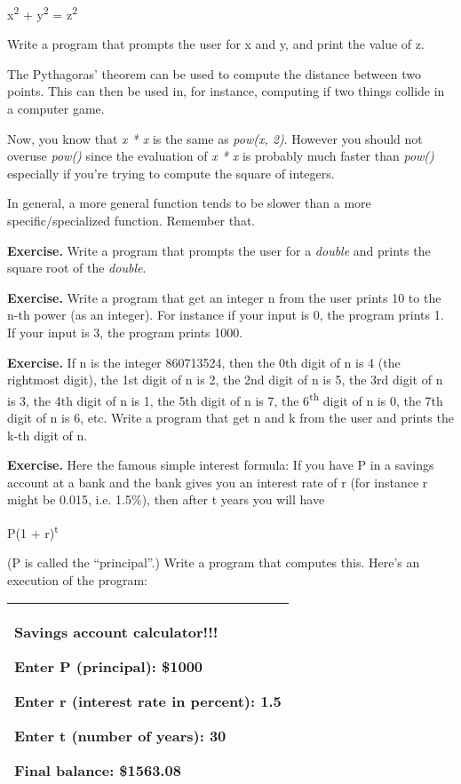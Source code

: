 \documentclass[
]{article}
\begin{document}
x\textsuperscript{2} + y\textsuperscript{2 } = z\textsuperscript{2 }

Write a program that prompts the user for x and y, and print the value
of z.

The Pythagoras' theorem can be used to compute the distance between two
points. This can then be used in, for instance, computing if two things
collide in a computer game.

Now, you know that \emph{x * x} is the same as \emph{pow(x, 2)}. However
you should not overuse \emph{pow()} since the evaluation of \emph{x * x}
is probably much faster than \emph{pow()} especially if you're trying to
compute the square of integers.

In general, a more general function tends to be slower than a more
specific/specialized function. Remember that.

\textbf{Exercise.} Write a program that prompts the user for a
\emph{double} and prints the square root of the \emph{double}.

\textbf{Exercise.} Write a program that get an integer n from the user
prints 10 to the n-th power (as an integer). For instance if your input
is 0, the program prints 1. If your input is 3, the program prints 1000.

\textbf{Exercise.} If n is the integer 860713524, then the 0th digit of
n is 4 (the rightmost digit), the 1st digit of n is 2, the 2nd digit of
n is 5, the 3rd digit of n is 3, the 4th digit of n is 1, the 5th digit
of n is 7, the 6\textsuperscript{th} digit of n is 0, the 7th digit of n
is 6, etc. Write a program that get n and k from the user and prints the
k-th digit of n.

\textbf{Exercise.} Here the famous simple interest formula: If you have
P in a savings account at a bank and the bank gives you an interest rate
of r (for instance r might be 0.015, i.e. 1.5\%), then after t years you
will have

P(1 + r)\textsuperscript{t}

(P is called the ``principal''.) Write a program that computes this.
Here's an execution of the program:

\begin{longtable}[]{@{}l@{}}
\toprule
\endhead
\begin{minipage}[t]{0.97\columnwidth}\raggedright
Savings account calculator!!!

Enter P (principal): \$\textbf{1000}

Enter r (interest rate in percent): \textbf{1.5}

Enter t (number of years): \textbf{30}

Final balance: \$1563.08\strut
\end{minipage}\tabularnewline
\bottomrule
\end{longtable}
\end{document}
